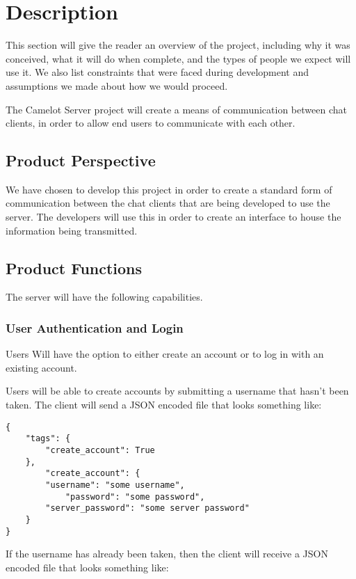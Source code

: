 \chapter{Description}\label{description}
This section will give the reader an overview of the project, including
why it was conceived, what it will do when complete, and the types of
people we expect will use it. We also list constraints that were faced
during development and assumptions we made about how we would proceed.

The Camelot Server project will create a means of communication between
chat clients, in order to allow end users to communicate with each
other.

\section{Product Perspective}\label{product-perspective}
We have chosen to develop this project in order to create a standard
form of communication between the chat clients that are being developed
to use the server. The developers will use this in order to create an
interface to house the information being transmitted.

\section{Product Functions}\label{product-functions}
The server will have the following capabilities.

\subsection{User Authentication and Login}
Users Will have the option to either create an account or to log in with an existing account.

Users will be able to create accounts by submitting a username that hasn't been taken. The client will send a JSON encoded file that looks something like:

\begin{lstlisting}[style=json]
{
    "tags": {
        "create_account": True
    },
        "create_account": {
        "username": "some username",
            "password": "some password",
        "server_password": "some server password"
    }
}
\end{lstlisting}

If the username has already been taken, then the client will
receive a JSON encoded file that looks something like:

